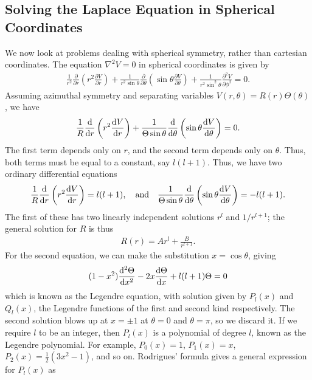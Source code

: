 \subsection{Solving the Laplace Equation in Spherical Coordinates}
We now look at problems dealing with spherical symmetry, rather than cartesian coordinates. The equation $\nabla^{2} V = 0$ in spherical coordinates is given by
\begin{align}
    \frac{1}{r^{2}} \frac{\partial}{\partial r} \left( r^{2} \frac{\partial V}{\partial r} \right) + \frac{1}{r^{2} \sin \theta} \frac{\partial}{\partial \theta}\left( \sin \theta \frac{\partial V}{\partial \theta} \right) + \frac{1}{r^{2} \sin^{2} \theta} \frac{\partial^{2} V}{\partial \phi^{2}} = 0.
\end{align}
Assuming azimuthal symmetry and separating variables $V(r,\theta) = R(r) \Theta(\theta)$, we have
\begin{align}
    \frac{1}{R} \frac{\di}{\di r} \left( r^{2} \frac{\di V}{\di r} \right) + \frac{1}{\Theta \sin \theta} \frac{\di}{\di \theta} \left( \sin \theta \frac{\di V}{\di \theta} \right) = 0.
\end{align}
The first term depends only on $r$, and the second term depends only on $\theta$. Thus, both terms must be equal to a constant, say $l(l+1)$. Thus, we have two ordinary differential equations
\begin{align}
    \frac{1}{R} \frac{\di}{\di r} \left( r^{2} \frac{\di V}{\di r} \right) = l(l+1), \quad \text{and} \quad \frac{1}{\Theta \sin \theta} \frac{\di}{\di \theta} \left( \sin \theta \frac{\di V}{\di \theta} \right) = -l(l+1).
\end{align}
The first of these has two linearly independent solutions $r^{l}$ and $1/r^{l+1}$; the general solution for $R$ is thus
\begin{align}
    R(r) = A r^{l} + \frac{B}{r^{l+1}}.
\end{align}
For the second equation, we can make the substitution $x = \cos \theta$, giving
\begin{align}
    (1-x^{2}) \frac{\mathrm{d}^{2} \Theta}{\mathrm{d}x^{2}} - 2x \frac{\mathrm{d}\Theta}{\mathrm{d}x} + l(l+1) \Theta = 0
\end{align}
which is known as the Legendre equation, with solution given by $P_{l}(x)$ and $Q_{l}(x)$, the Legendre functions of the first and second kind respectively. The second solution blows up at $x = \pm 1$ at $\theta = 0$ and $\theta = \pi$, so we discard it. If we require $l$ to be an integer, then $P_{l}(x)$ is a polynomial of degree $l$, known as the Legendre polynomial. For example, $P_{0}(x) = 1$, $P_{1}(x) = x$, $P_{2}(x) = \frac{1}{2} (3x^{2} - 1)$, and so on. Rodrigues' formula gives a general expression for $P_{l}(x)$ as
